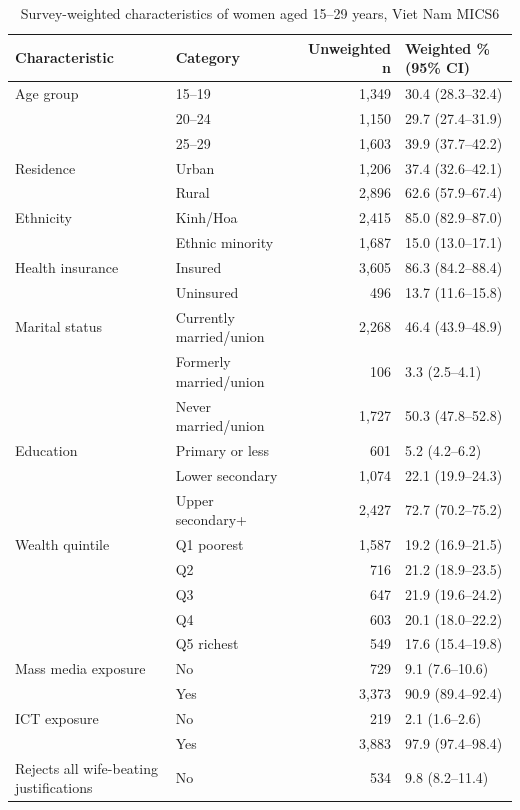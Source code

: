 \begin{table}[H]
\caption{Survey-weighted characteristics of women aged 15--29 years, Viet Nam MICS6}
\centering
\small
\begin{tabular}{|p{4.8cm}|p{3.5cm}|r|p{3.0cm}|}
\hline
\textbf{Characteristic} & \textbf{Category} & \textbf{Unweighted n} & \textbf{Weighted \% (95\% CI)} \\
\hline
Age group & 15--19 & 1,349 & 30.4 (28.3--32.4) \\
 & 20--24 & 1,150 & 29.7 (27.4--31.9) \\
 & 25--29 & 1,603 & 39.9 (37.7--42.2) \\
\hline
Residence & Urban & 1,206 & 37.4 (32.6--42.1) \\
 & Rural & 2,896 & 62.6 (57.9--67.4) \\
\hline
Ethnicity & Kinh/Hoa & 2,415 & 85.0 (82.9--87.0) \\
 & Ethnic minority & 1,687 & 15.0 (13.0--17.1) \\
\hline
Health insurance & Insured & 3,605 & 86.3 (84.2--88.4) \\
 & Uninsured & 496 & 13.7 (11.6--15.8) \\
\hline
Marital status & Currently married/union & 2,268 & 46.4 (43.9--48.9) \\
 & Formerly married/union & 106 & 3.3 (2.5--4.1) \\
 & Never married/union & 1,727 & 50.3 (47.8--52.8) \\
\hline
Education & Primary or less & 601 & 5.2 (4.2--6.2) \\
 & Lower secondary & 1,074 & 22.1 (19.9--24.3) \\
 & Upper secondary+ & 2,427 & 72.7 (70.2--75.2) \\
\hline
Wealth quintile & Q1 poorest & 1,587 & 19.2 (16.9--21.5) \\
 & Q2 & 716 & 21.2 (18.9--23.5) \\
 & Q3 & 647 & 21.9 (19.6--24.2) \\
 & Q4 & 603 & 20.1 (18.0--22.2) \\
 & Q5 richest & 549 & 17.6 (15.4--19.8) \\
\hline
Mass media exposure & No & 729 & 9.1 (7.6--10.6) \\
 & Yes & 3,373 & 90.9 (89.4--92.4) \\
\hline
ICT exposure & No & 219 & 2.1 (1.6--2.6) \\
 & Yes & 3,883 & 97.9 (97.4--98.4) \\
\hline
Rejects all wife-beating justifications & No & 534 & 9.8 (8.2--11.4) \\

\end{tabular}
\end{table}
